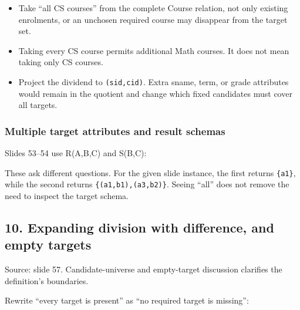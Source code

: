 \begin{itemize}
\tightlist
\item
  Take ``all CS courses'' from the complete Course relation, not only existing enrolments, or an unchosen required course may disappear from the target set.
\item
  Taking every CS course permits additional Math courses. It does not mean taking only CS courses.
\item
  Project the dividend to \texttt{(\allowbreak{}sid,\allowbreak{}cid)\allowbreak{}}. Extra sname, term, or grade attributes would remain in the quotient and change which fixed candidates must cover all targets.
\end{itemize}

\subsubsection{Multiple target attributes and result schemas}\label{05_relational_algebra_en-multiple-target-attributes-and-result-schemas}

Slides 53--54 use R(A,B,C) and S(B,C):


These ask different questions. For the given slide instance, the first returns \texttt{\{a1\}}, while the second returns \texttt{\{(a1,b1),(a3,b2)\}}. Seeing ``all'' does not remove the need to inspect the target schema.

\subsection{10. Expanding division with difference, and empty targets}\label{05_relational_algebra_en-expanding-division-with-difference-and-empty-targets}

Source: slide 57. Candidate-universe and empty-target discussion clarifies the definition's boundaries.

Rewrite ``every target is present'' as ``no required target is missing'':


